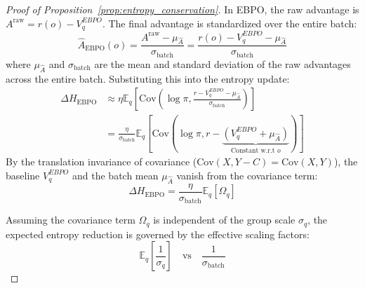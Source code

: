 \documentclass{article}
\theoremstyle{plain}
\theoremstyle{definition}
\theoremstyle{remark}
\begin{document}
\begin{proof}[Proof of Proposition~\ref{prop:entropy_conservation}]
In EBPO, the raw advantage is $A^{\text{raw}} = r(o) - V^{EBPO}_q$. The final advantage is standardized over the entire batch:
\begin{equation*}
    \hat{A}_{\text{EBPO}}(o) = \frac{A^{\text{raw}} - \mu_{\hat{A}}}{\sigma_{\text{batch}}} = \frac{r(o) - V^{EBPO}_q - \mu_{\hat{A}}}{\sigma_{\text{batch}}}
\end{equation*}
where $\mu_{\hat{A}}$ and $\sigma_{\text{batch}}$ are the mean and standard deviation of the raw advantages across the entire batch.
Substituting this into the entropy update:
\begin{align*}
    \Delta H_{\text{EBPO}} &\approx \eta \mathbb{E}_{q} \left[ \text{Cov}\left( \log \pi, \frac{r - V^{EBPO}_q - \mu_{\hat{A}}}{\sigma_{\text{batch}}} \right) \right] \\
    &= \frac{\eta}{\sigma_{\text{batch}}} \mathbb{E}_{q} \left[ \text{Cov}( \log \pi, r - \underbrace{(V^{EBPO}_q + \mu_{\hat{A}})}_{\text{Constant w.r.t } o} ) \right]
\end{align*}
By the translation invariance of covariance ($\text{Cov}(X, Y - C) = \text{Cov}(X, Y)$), the baseline $V^{EBPO}_q$ and the batch mean $\mu_{\hat{A}}$ vanish from the covariance term:
\begin{equation*}
    \Delta H_{\text{EBPO}} = \frac{\eta}{\sigma_{\text{batch}}} \mathbb{E}_{q} [ \Omega_q ]
\end{equation*}

Assuming the covariance term $\Omega_q$ is independent of the group scale $\sigma_q$, the expected entropy reduction is governed by the effective scaling factors:
$$ \mathbb{E}_q \left[ \frac{1}{\sigma_q} \right] \quad \text{vs} \quad \frac{1}{\sigma_{\text{batch}}} $$


\end{proof}
\end{document}
